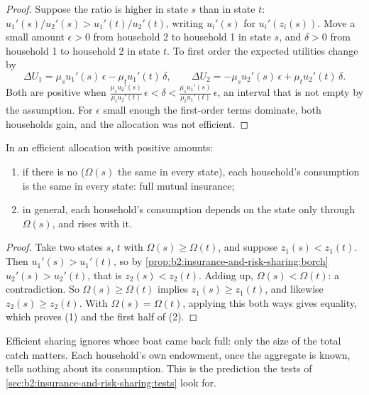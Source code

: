 \begin{proof}
Suppose the ratio is higher in state $s$ than in state $t$: $u_1'(s)/u_2'(s) > u_1'(t)/u_2'(t)$,
writing $u_i'(s)$ for $u_i'(z_i(s))$. Move a small amount $\epsilon > 0$ from household 2 to
household 1 in state $s$, and $\delta > 0$ from household 1 to household 2 in state $t$. To first
order the expected utilities change by
\[
\Delta U_1 = \mu_s u_1'(s)\,\epsilon - \mu_t u_1'(t)\,\delta, \qquad \Delta U_2 = -\mu_s
u_2'(s)\,\epsilon + \mu_t u_2'(t)\,\delta .
\]
Both are positive when $\frac{\mu_s u_2'(s)}{\mu_t u_2'(t)}\,\epsilon < \delta < \frac{\mu_s
u_1'(s)}{\mu_t u_1'(t)}\,\epsilon$, an interval that is not empty by the assumption. For $\epsilon$
small enough the first-order terms dominate, both households gain, and the allocation was not
efficient.
\end{proof}

\begin{corollary}\label{cor:b2:insurance-and-risk-sharing:aggregate-only}
In an efficient allocation with positive amounts:
\begin{enumerate}
  \item if there is no  ($\Omega(s)$ the same in every state), each household's
        consumption is the same in every state: full mutual insurance;
  \item in general, each household's consumption depends on the state only through $\Omega(s)$, and
        rises with it.
\end{enumerate}
\end{corollary}

\begin{proof}
Take two states $s$, $t$ with $\Omega(s) \ge \Omega(t)$, and suppose $z_1(s) < z_1(t)$. Then
$u_1'(s) > u_1'(t)$, so by \cref{prop:b2:insurance-and-risk-sharing:borch} $u_2'(s) > u_2'(t)$, that
is $z_2(s) < z_2(t)$. Adding up, $\Omega(s) < \Omega(t)$: a contradiction. So $\Omega(s) \ge
\Omega(t)$ implies $z_1(s) \ge z_1(t)$, and likewise $z_2(s) \ge z_2(t)$. With $\Omega(s) =
\Omega(t)$, applying this both ways gives equality, which proves (1) and the first half of (2).
\end{proof}

Efficient sharing ignores whose boat came back full: only the size of the total catch matters. Each
household's own endowment, once the aggregate is known, tells nothing about its consumption. This is
the prediction the tests of \cref{sec:b2:insurance-and-risk-sharing:tests} look for.

